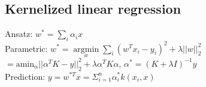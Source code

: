 \iffalse
\subsection*{Parametric vs. Nonparametric}
\emph{Parametric}: have finite set of parameters\\
E.g. linear regression, linear perceptron,...\\
\emph{Nonparametric}: grow in complexity with the size of the data\\
E.g. kernelized Perceptron, k-NN,...
\fi

\subsection*{Kernelized linear regression}
Ansatz: $w^*=\sum_i \alpha_i x$\\
Parametric: $w^* = \underset{w}{\operatorname{argmin}} \sum_i (w^Tx_i-y_i)^2 + \lambda ||w||_2^2$\\
$= \operatorname{amin_{\alpha}} ||\alpha^T K -y||_2^2 + \lambda \alpha^T K \alpha$, $\alpha^* = (K+\lambda I)^{-1} y$\\
Prediction: $y = w^{*T} x = \Sigma_{i=1}^n \alpha_i^* k(x_i,x)$